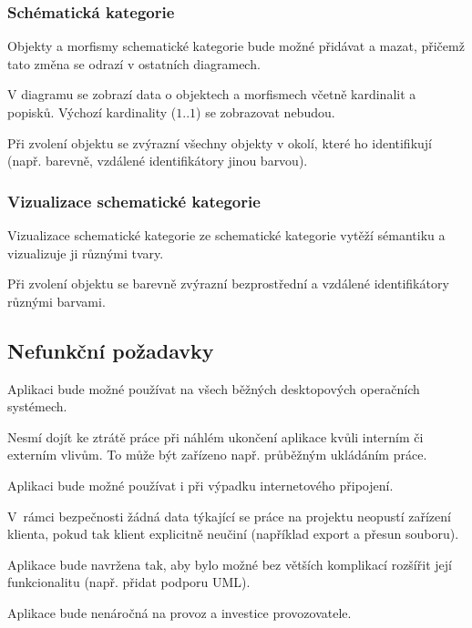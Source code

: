 \subsubsection*{Schématická kategorie}
\begin{enumfp}[resume]
  \item Objekty a morfismy schematické kategorie bude možné přidávat a mazat, přičemž tato změna se odrazí v ostatních diagramech.
  \item V diagramu se zobrazí data o objektech a morfismech včetně kardinalit a popisků.
  Výchozí kardinality ($1..1$) se zobrazovat nebudou.
  \item Při zvolení objektu se zvýrazní všechny objekty v okolí, které ho identifikují (např. barevně, vzdálené identifikátory jinou barvou).
\end{enumfp}

\subsubsection*{Vizualizace schematické kategorie}
\begin{enumfp}[resume]
  \item Vizualizace schematické kategorie ze schematické kategorie vytěží sémantiku a vizualizuje ji různými tvary.
  \item Při zvolení objektu se barevně zvýrazní bezprostřední a vzdálené identifikátory různými barvami.
\end{enumfp}

\subsection{Nefunkční požadavky}

\begin{enumnfp}
  \item Aplikaci bude možné používat na všech běžných desktopových operačních systémech.\label{nfp:can-use-everywhere}
  \item Nesmí dojít ke ztrátě práce při náhlém ukončení aplikace kvůli interním či externím vlivům.
  To může být zařízeno např. průběžným ukládáním práce.
  \item Aplikaci bude možné používat i při výpadku internetového připojení.
  \item V~rámci bezpečnosti žádná data týkající se práce na projektu neopustí zařízení klienta, pokud tak klient explicitně neučiní (například export a přesun souboru).\label{nfp:safety}
  \item Aplikace bude navržena tak, aby bylo možné bez větších komplikací rozšířit její funkcionalitu (např. přidat podporu UML).
  \item Aplikace bude nenáročná na provoz a investice provozovatele.\label{nfp:nenarocnost}
\end{enumnfp}

